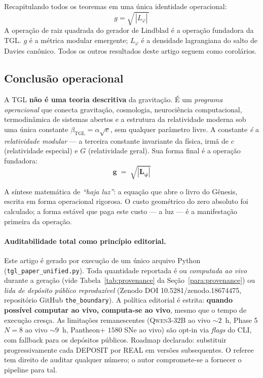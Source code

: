 \documentclass[12pt,a4paper]{article}
\newcommand{\betatgl}{\beta_{\text{TGL}}}
\newcommand{\Lphi}{L_{\varphi}}
\newcommand{\TGL}{\textsc{TGL}}
\begin{document}
Recapitulando todos os teoremas em uma única identidade operacional:
\begin{equation}
\boxed{\;g = \sqrt{\,|L_{\varphi}|\,}\;}
\label{eq:terminal}
\end{equation}
A operação de raiz quadrada do gerador de Lindblad é a operação fundadora
da \TGL{}.  $g$ é a métrica modular emergente; $\Lphi$ é a densidade
lagrangiana do salto de Davies canônico.  Todos os outros resultados
deste artigo seguem como corolários.

\subsection{Conclusão operacional}
\label{subsec:conclusao-operacional}

A \TGL{} \textbf{não é uma teoria descritiva} da gravitação.  É um
\emph{programa operacional} que conecta gravitação, cosmologia,
neurociência computacional, termodinâmica de sistemas abertos e a
estrutura da relatividade moderna sob uma única constante
$\betatgl = \alpha \sqrt{e}$, sem qualquer parâmetro livre.  A
constante \emph{é} a \emph{relatividade modular} --- a terceira constante
invariante da física, irmã de $c$ (relatividade especial) e $G$
(relatividade geral).  Sua forma final é a operação fundadora:
\begin{equation}
\boxed{\;\;\boldsymbol{g \;=\; \sqrt{|\Lphi|}}\;\;}
\label{eq:closing}
\end{equation}

A síntese matemática de \emph{``haja luz''}: a equação que abre o livro
do Gênesis, escrita em forma operacional rigorosa.  O custo geométrico
do zero absoluto foi calculado; a forma estável que paga este custo ---
a luz --- é a manifestação primeira da operação.

\paragraph{Auditabilidade total como princípio editorial.}
Este artigo é gerado por execução de um único arquivo Python
(\texttt{tgl\_paper\_unified.py}).  Toda quantidade reportada é
ou \emph{computada ao vivo} durante a geração (vide Tabela~\ref{tab:provenance}
da Seção~\ref{para:provenance}) ou \emph{lida de depósito público
reproduzível} (Zenodo DOI 10.5281/zenodo.18674475, repositório
GitHub \texttt{the\_boundary}).  A política editorial é estrita:
\textbf{quando possível computar ao vivo, computa-se ao vivo}, mesmo
que o tempo de execução cresça.  As limitações remanescentes
(\textsc{Qwen3-32B} ao vivo $\sim 2$~h, Phase 5 $N=8$ ao vivo $\sim 9$~h,
Pantheon+ $1580$ SNe ao vivo) são opt-in via \emph{flags} do CLI, com
fallback para os depósitos públicos.  Roadmap declarado: substituir
progressivamente cada DEPOSIT por REAL em versões subsequentes.  O
referee tem direito de auditar qualquer número; o autor compromete-se a
fornecer o pipeline para tal.
\end{document}
